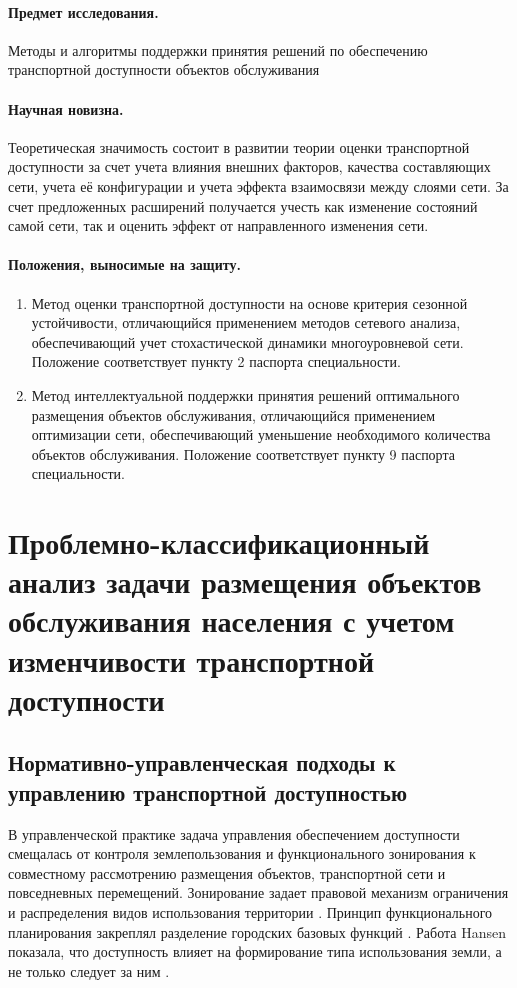 \documentclass[14pt,a4paper]{extarticle}
\begin{document}
\paragraph*{Предмет исследования.}
Методы и алгоритмы поддержки принятия решений по обеспечению транспортной доступности объектов обслуживания

\paragraph*{Научная новизна.}

Теоретическая значимость состоит в развитии теории оценки транспортной доступности за счет учета влияния внешних факторов, качества составляющих сети, учета её конфигурации и учета эффекта взаимосвязи между слоями сети. За счет предложенных расширений получается учесть как изменение состояний самой сети, так и оценить эффект от направленного изменения сети.

\paragraph*{Положения, выносимые на защиту.}
\begin{enumerate}
    \item Метод оценки транспортной доступности на основе критерия сезонной устойчивости, отличающийся применением методов сетевого анализа, обеспечивающий учет стохастической динамики многоуровневой сети. Положение соответствует пункту 2 паспорта специальности.
    \item Метод интеллектуальной поддержки принятия решений оптимального размещения объектов обслуживания, отличающийся применением оптимизации сети, обеспечивающий уменьшение необходимого количества объектов обслуживания. Положение соответствует пункту 9 паспорта специальности.
\end{enumerate}

\section*{Проблемно-классификационный анализ задачи размещения объектов обслуживания населения с учетом изменчивости транспортной доступности}

\subsection*{Нормативно-управленческая подходы к управлению транспортной доступностью}

В управленческой практике задача управления обеспечением доступности смещалась от контроля землепользования и функционального зонирования к совместному рассмотрению размещения объектов, транспортной сети и повседневных перемещений. Зонирование задает правовой механизм ограничения и распределения видов использования территории \cite{britannicaZoning}. Принцип функционального планирования закреплял разделение городских базовых функций \cite{gold1998charter}. Работа Hansen показала, что доступность влияет на формирование типа использования земли, а не только следует за ним \cite{hansen1959accessibility}.
\end{document}
